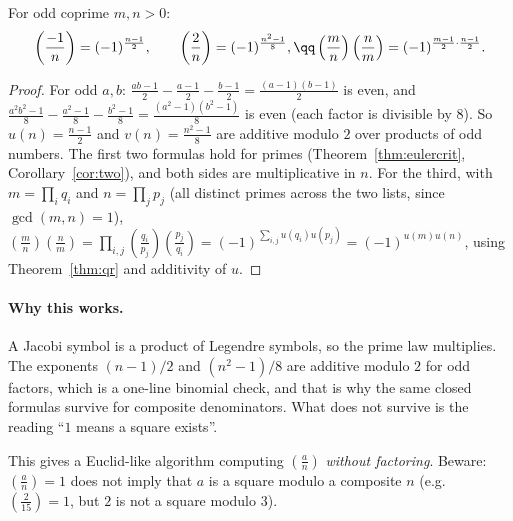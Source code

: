 \begin{proposition}\label{prop:jacobi}
For odd coprime $m,n>0$:
\[
\begin{gathered}\left(\frac{-1}n\right)=(-1)^{\frac{n-1}2},\qquad\left(\frac2n\right)=(-1)^{\frac{n^2-1}8},\qq\left(\frac mn\right)\left(\frac nm\right)=(-1)^{\frac{m-1}2\cdot\frac{n-1}2}.\end{gathered}
\]
\end{proposition}
\begin{proof}
For odd $a,b$: $\frac{ab-1}2-\frac{a-1}2-\frac{b-1}2=\frac{(a-1)(b-1)}2$ is even, and $\frac{a^2b^2-1}8-\frac{a^2-1}8-\frac{b^2-1}8=\frac{(a^2-1)(b^2-1)}8$ is even (each factor is divisible by $8$). So $u(n)=\frac{n-1}2$ and $v(n)=\frac{n^2-1}8$ are additive modulo $2$ over products of odd numbers. The first two formulas hold for primes (Theorem~\ref{thm:eulercrit}, Corollary~\ref{cor:two}), and both sides are multiplicative in $n$. For the third, with $m=\prod_iq_i$ and $n=\prod_jp_j$ (all distinct primes across the two lists, since $\gcd(m,n)=1$),
$\left(\frac mn\right)\left(\frac nm\right)=\prod_{i,j}\left(\frac{q_i}{p_j}\right)\left(\frac{p_j}{q_i}\right)=(-1)^{\sum_{i,j}u(q_i)u(p_j)}=(-1)^{u(m)u(n)}$, using Theorem~\ref{thm:qr} and additivity of $u$.
\end{proof}

\paragraph{Why this works.}
A Jacobi symbol is a product of Legendre symbols, so the prime law multiplies. The exponents $(n-1)/2$ and $(n^2-1)/8$ are additive modulo $2$ for odd factors, which is a one-line binomial check, and that is why the same closed formulas survive for composite denominators. What does not survive is the reading ``$1$ means a square exists''.

This gives a Euclid-like algorithm computing $\left(\frac an\right)$ \emph{without factoring}. Beware: $\left(\frac an\right)=1$ does not imply that $a$ is a square modulo a composite $n$ (e.g.\ $\left(\frac2{15}\right)=1$, but $2$ is not a square modulo $3$).

